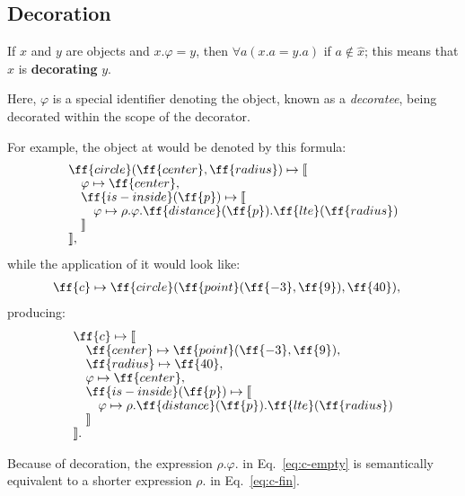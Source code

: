 \subsection{Decoration}\label{sec:decoration}

\begin{eodefinition}\label{def:decorator}
If $x$ and $y$ are objects and $x.\varphi = y$, then
  $\forall a (x.a = y.a)$ if $a \not\in \hat{x}$;
  this means that $x$ is \textbf{decorating} $y$.
\end{eodefinition}

Here, $\varphi$ is a special identifier denoting the object,
known as a \emph{decoratee}, being decorated
within the scope of the decorator.

For example, the object at  would
be denoted by this formula:
\begin{equation}\label{eq:c-empty}
\begin{split}
& \ff{circle}(\ff{center}, \ff{radius}) \mapsto \llbracket \br
& \quad \varphi \mapsto \ff{center}, \br
& \quad \ff{is-inside}(\ff{p}) \mapsto \llbracket \br
& \quad \quad \varphi \mapsto \rho.\varphi.\ff{distance}(\ff{p}).\ff{lte}(\ff{radius}) \br
& \quad \rrbracket \br
& \rrbracket,
\end{split}
\end{equation}
while the application of it would look like:
\begin{equation}
\begin{split}
\ff{c} & \mapsto \ff{circle}(\ff{point}(\ff{-3}, \ff{9}), \ff{40}),
\end{split}
\end{equation}
producing:
\begin{equation}\label{eq:c-fin}
\begin{split}
& \ff{c} \mapsto \llbracket \br
& \quad \ff{center} \mapsto \ff{point}(\ff{-3}, \ff{9}), \br
& \quad \ff{radius} \mapsto \ff{40}, \br
& \quad \varphi \mapsto \ff{center}, \br
& \quad \ff{is-inside}(\ff{p}) \mapsto \llbracket \br
& \quad \quad \varphi \mapsto \rho.\ff{distance}(\ff{p}).\ff{lte}(\ff{radius}) \br
& \quad \rrbracket \br
& \rrbracket.
\end{split}
\end{equation}

Because of decoration, the expression
$\rho$.$\varphi$. in Eq.~\ref{eq:c-empty} is semantically equivalent to a shorter expression
$\rho$. in Eq.~\ref{eq:c-fin}.

